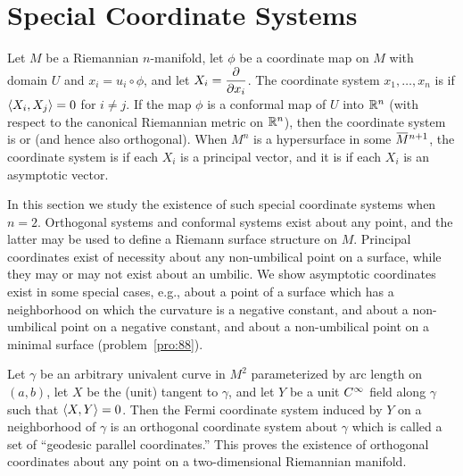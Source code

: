 \documentclass[../main]{subfiles}
\begin{document}
\section{Special Coordinate Systems}\label{ch09:s5}

Let $M$ be a Riemannian $n$-manifold, let $\phi$ be a coordinate map on $M$ with domain $U$ and $x_i = u_i \circ \phi$, and let $X_i = \dfrac{\partial }{\partial x_i}$. The coordinate system $x_1, \dots,x_n$ is  if $\left\langle X_i,X_j\right\rangle = 0$ for $i \ne j$. If the map $\phi$ is a conformal map of $U$ into $\mathbb{R}^n$ (with respect to the canonical Riemannian metric on $\mathbb{R}^n$), then the coordinate system is  or  (and hence also orthogonal). When $M^n$ is a hypersurface in some $\xoverline{M}^{n+1}$, the coordinate system is  if each $X_i$ is a principal vector, and it is  if each $X_i$ is an asymptotic vector.

In this section we study the existence of such special coordinate systems when $n = 2$. Orthogonal systems and conformal systems exist about any point, and the latter may be used to define a Riemann surface structure on $M$. Principal coordinates exist of necessity about any non-umbilical point on a surface, while they may or may not exist about an umbilic. We show asymptotic coordinates exist in some special cases, e.g., about a point of a surface which has a neighborhood on which the curvature is a negative constant, and about a non-umbilical point on a negative constant, and about a non-umbilical point on a minimal surface (problem~\ref{pro:88}).



\begin{theorem}[Gauss 1827] \label{thm:ch9.5.1}
    Let $\gamma$ be an arbitrary univalent curve in $M^2$ parameterized by arc length on $(a, b)$, let $X$ be the (unit) tangent to $\gamma$, and let $Y$ be a unit $C^\infty$ field along $\gamma$ such that $\left\langle X,Y\right\rangle = 0$. Then the Fermi coordinate system induced by $Y$ on a neighborhood of $\gamma$ is an orthogonal coordinate system about $\gamma$ which is called a set of ``geodesic parallel coordinates.'' This proves the existence of orthogonal coordinates about any point on a two-dimensional Riemannian manifold.
\end{theorem}

\end{document}
